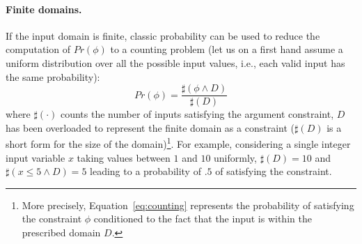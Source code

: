 %		

\paragraph{Finite domains.} 

If the input domain is finite, classic probability can be used to reduce the computation of $Pr(\phi)$ to a counting problem (let us on a first hand assume a uniform distribution over all the possible input values, i.e., each valid input has the same probability):
%
\begin{equation}\label{eq:counting}
	Pr(\phi) = \frac{\sharp(\phi \land D)}{\sharp(D)}
\end{equation}
%
\noindent where $\sharp(\cdot)$ counts the number of inputs satisfying the argument constraint, $D$ has been overloaded to represent the finite domain as a constraint ($\sharp(D)$ is a short form for the size of the domain)\footnote{More precisely, Equation~\eqref{eq:counting} represents the probability of satisfying the constraint $\phi$ conditioned to the fact that the input is within the prescribed domain $D$.}. For example, considering a single integer input variable $x$ taking values between $1$ and $10$ uniformly, $\sharp(D)=10$ and $\sharp(x\leq5 \land D)=5$ leading to a probability of $.5$ of satisfying the constraint.

